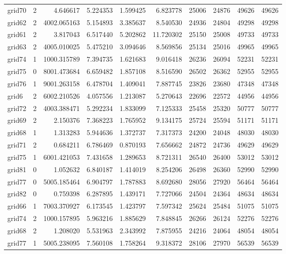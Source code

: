 \begin{longtable}{|l|r|r|r|r|r|r|r|r|r|}
grid70 & 2 & 4.646617 & 5.224353 & 1.599425 & 6.823778 & 25006 & 24876 & 49626 & 49626 \\
grid62 & 2 & 4002.065163 & 5.154893 & 3.385637 & 8.540530 & 24936 & 24804 & 49298 & 49298 \\
grid61 & 2 & 3.817043 & 6.517440 & 5.202862 & 11.720302 & 25150 & 25008 & 49733 & 49733 \\
grid63 & 2 & 4005.010025 & 5.475210 & 3.094646 & 8.569856 & 25134 & 25016 & 49965 & 49965 \\
grid74 & 1 & 1000.315789 & 7.394735 & 1.621683 & 9.016418 & 26236 & 26094 & 52231 & 52231 \\
grid75 & 0 & 8001.473684 & 6.659482 & 1.857108 & 8.516590 & 26502 & 26362 & 52955 & 52955 \\
grid76 & 1 & 9001.263158 & 6.478704 & 1.409041 & 7.887745 & 23826 & 23680 & 47348 & 47348 \\
grid6 & 2 & 6002.210526 & 4.057556 & 1.213087 & 5.270643 & 22696 & 22572 & 44956 & 44956 \\
grid72 & 2 & 4003.388471 & 5.292234 & 1.833099 & 7.125333 & 25458 & 25320 & 50777 & 50777 \\
grid69 & 2 & 2.150376 & 7.368223 & 1.765952 & 9.134175 & 25724 & 25594 & 51171 & 51171 \\
grid68 & 1 & 1.313283 & 5.944636 & 1.372737 & 7.317373 & 24200 & 24048 & 48030 & 48030 \\
grid71 & 2 & 0.684211 & 6.786469 & 0.870193 & 7.656662 & 24872 & 24736 & 49629 & 49629 \\
grid75 & 1 & 6001.421053 & 7.431658 & 1.289653 & 8.721311 & 26540 & 26400 & 53012 & 53012 \\
grid81 & 0 & 1.052632 & 6.840187 & 1.414019 & 8.254206 & 26498 & 26360 & 52990 & 52990 \\
grid77 & 0 & 5005.185464 & 6.904797 & 1.787883 & 8.692680 & 28056 & 27920 & 56464 & 56464 \\
grid82 & 0 & 0.759398 & 6.287895 & 1.439171 & 7.727066 & 24504 & 24364 & 48634 & 48634 \\
grid66 & 1 & 7003.370927 & 6.173545 & 1.423797 & 7.597342 & 25624 & 25484 & 51075 & 51075 \\
grid74 & 2 & 1000.157895 & 5.963216 & 1.885629 & 7.848845 & 26266 & 26124 & 52276 & 52276 \\
grid68 & 2 & 1.208020 & 5.531963 & 2.343992 & 7.875955 & 24216 & 24064 & 48054 & 48054 \\
grid77 & 1 & 5005.238095 & 7.560108 & 1.758264 & 9.318372 & 28106 & 27970 & 56539 & 56539 \\

\end{longtable}

